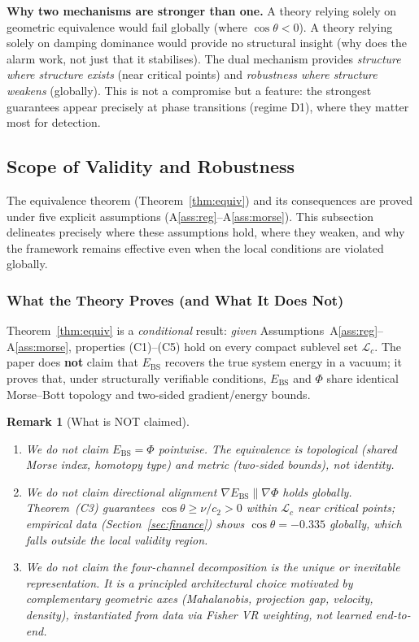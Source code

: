 \documentclass[11pt,a4paper]{article}
\newcommand{\Ebs}{E_{\mathrm{BS}}}
\newcommand{\grad}{\nabla}
\newtheorem{remark}[theorem]{Remark}
\begin{document}
\noindent
\textbf{Why two mechanisms are stronger than one.}
A theory relying solely on geometric equivalence would fail
globally (where $\cos\theta < 0$).  A theory relying solely
on damping dominance would provide no structural insight
(why does the alarm work, not just that it stabilises).
The dual mechanism provides \emph{structure where structure
exists} (near critical points) and \emph{robustness where
structure weakens} (globally).  This is not a compromise but
a feature: the strongest guarantees appear precisely at phase
transitions (regime D1), where they matter most for detection.

\subsection{Scope of Validity and Robustness}\label{sec:scope}

The equivalence theorem (Theorem~\ref{thm:equiv}) and its
consequences are proved under five explicit assumptions
(A\ref{ass:reg}--A\ref{ass:morse}).  This subsection delineates
precisely where these assumptions hold, where they weaken, and
why the framework remains effective even when the local conditions
are violated globally.

\subsubsection{What the Theory Proves (and What It Does Not)}

Theorem~\ref{thm:equiv} is a \emph{conditional} result:
\emph{given} Assumptions~A\ref{ass:reg}--A\ref{ass:morse},
properties (C1)--(C5) hold on every compact sublevel set
$\mathcal{L}_c$.  The paper does \textbf{not} claim that $\Ebs$
recovers the true system energy in a vacuum; it proves that, under
structurally verifiable conditions, $\Ebs$ and $\Phi$ share
identical Morse--Bott topology and two-sided gradient/energy bounds.

\begin{remark}[What is NOT claimed]\label{rem:notclaimed}
\begin{enumerate}[nosep]
  \item We do not claim $\Ebs = \Phi$ pointwise.  The equivalence
    is \emph{topological} (shared Morse index, homotopy type)
    and \emph{metric} (two-sided bounds), not identity.
  \item We do not claim directional alignment $\grad\Ebs \parallel
    \grad\Phi$ holds globally.  Theorem~(C3) guarantees
    $\cos\theta \ge \nu / c_2 > 0$ \emph{within} $\mathcal{L}_c$
    near critical points; empirical data (Section~\ref{sec:finance})
    shows $\cos\theta = {-}0.335$ globally, which falls outside
    the local validity region.
  \item We do not claim the four-channel decomposition is the
    unique or inevitable representation.  It is a
    \emph{principled architectural choice} motivated by
    complementary geometric axes (Mahalanobis, projection gap,
    velocity, density), instantiated from data via Fisher VR
    weighting, not learned end-to-end.
\end{enumerate}
\end{remark}
\end{document}
